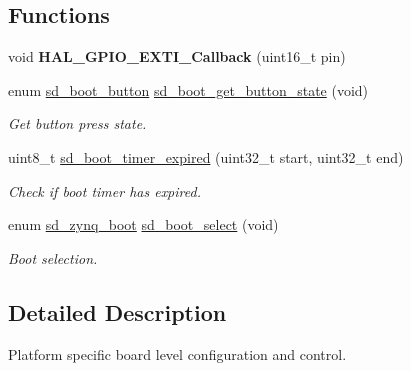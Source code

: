 \subsection*{Functions}
\begin{DoxyCompactItemize}
\item 
\mbox{\label{group___s_d___platform_gaf02d5f52d29caba0ba168f5c53539c8f}} 
void {\bfseries H\+A\+L\+\_\+\+G\+P\+I\+O\+\_\+\+E\+X\+T\+I\+\_\+\+Callback} (uint16\+\_\+t pin)
\item 
\mbox{\label{group___s_d___platform_ga0d7f90ea76b8ffd5d714122177f84b3b}} 
enum \mbox{\hyperlink{group___s_d___platform_ga0cfdf02c4e2dcebe57216fb62c79d464}{sd\+\_\+boot\+\_\+button}} \mbox{\hyperlink{group___s_d___platform_ga0d7f90ea76b8ffd5d714122177f84b3b}{sd\+\_\+boot\+\_\+get\+\_\+button\+\_\+state}} (void)
\begin{DoxyCompactList}\small\item\em Get button press state. \end{DoxyCompactList}\item 
uint8\+\_\+t \mbox{\hyperlink{group___s_d___platform_ga12d2befc51ccaa811a666d7eca5761ff}{sd\+\_\+boot\+\_\+timer\+\_\+expired}} (uint32\+\_\+t start, uint32\+\_\+t end)
\begin{DoxyCompactList}\small\item\em Check if boot timer has expired. \end{DoxyCompactList}\item 
\mbox{\label{group___s_d___platform_ga28381c9d642f66d9a6968ff7406a63d4}} 
enum \mbox{\hyperlink{group___s_d___platform_ga06667de95c86bfcdef8bcc8ab13cb2d4}{sd\+\_\+zynq\+\_\+boot}} \mbox{\hyperlink{group___s_d___platform_ga28381c9d642f66d9a6968ff7406a63d4}{sd\+\_\+boot\+\_\+select}} (void)
\begin{DoxyCompactList}\small\item\em Boot selection. \end{DoxyCompactList}\end{DoxyCompactItemize}


\subsection{Detailed Description}
Platform specific board level configuration and control. 



